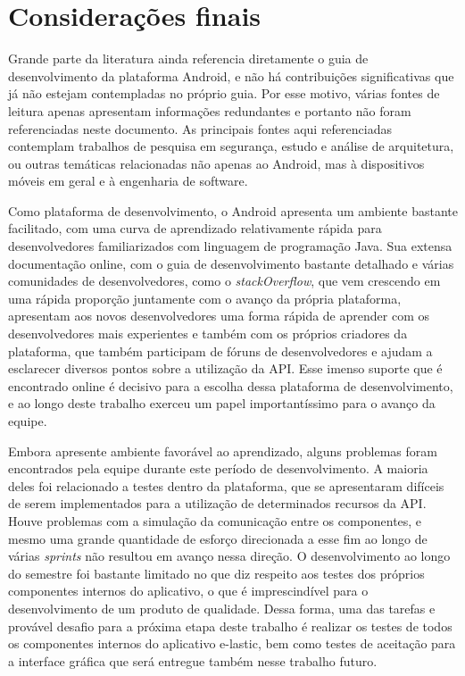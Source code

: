 \chapter{Considerações finais}
\label{consideracoes-finais}

Grande parte da literatura ainda referencia diretamente o guia de desenvolvimento da plataforma Android, e não há contribuições significativas que já não estejam contempladas no próprio guia. Por esse motivo, várias fontes de leitura apenas apresentam informações redundantes e portanto não foram referenciadas neste documento. As principais fontes aqui referenciadas contemplam trabalhos de pesquisa em segurança, estudo e análise de arquitetura, ou outras temáticas relacionadas não apenas ao Android, mas à dispositivos móveis em geral e à engenharia de software.

Como plataforma de desenvolvimento, o Android apresenta um ambiente bastante facilitado, com uma curva de aprendizado relativamente rápida para desenvolvedores familiarizados com linguagem de programação Java. Sua extensa documentação online, com o guia de desenvolvimento bastante detalhado e várias comunidades de desenvolvedores, como o \textit{stackOverflow}, que vem crescendo em uma rápida proporção juntamente com o avanço da própria plataforma, apresentam aos novos desenvolvedores uma forma rápida de aprender com os desenvolvedores mais experientes e também com os próprios criadores da plataforma, que também participam de fóruns de desenvolvedores e ajudam a esclarecer diversos pontos sobre a utilização da API. Esse imenso suporte que é encontrado online é decisivo para a escolha dessa plataforma de desenvolvimento, e ao longo deste trabalho exerceu um papel importantíssimo para o avanço da equipe.

Embora apresente ambiente favorável ao aprendizado, alguns problemas foram encontrados pela equipe durante este período de desenvolvimento. A maioria deles foi relacionado a testes dentro da plataforma, que se apresentaram difíceis de serem implementados para a utilização de determinados recursos da API. Houve problemas com a simulação da comunicação entre os componentes, e mesmo uma grande quantidade de esforço direcionada a esse fim ao longo de várias \textit{sprints} não resultou em avanço nessa direção. O desenvolvimento ao longo do semestre foi bastante limitado no que diz respeito aos testes dos próprios componentes internos do aplicativo, o que é imprescindível para o desenvolvimento de um produto de qualidade. Dessa forma, uma das tarefas e provável desafio para a próxima etapa deste trabalho é realizar os testes de todos os componentes internos do aplicativo e-lastic, bem como testes de aceitação para a interface gráfica que será entregue também nesse trabalho futuro. 

